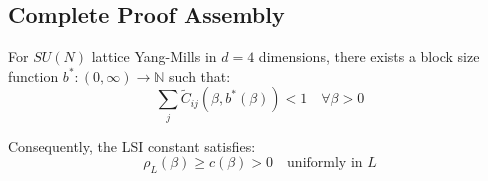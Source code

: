 \subsection{Complete Proof Assembly}

\begin{theorem}
\label{thm:block-dobrushin-all-beta}
For $SU(N)$ lattice Yang-Mills in $d = 4$ dimensions, there exists a block 
size function $b^*: (0, \infty) \to \mathbb{N}$ such that:
\[
\sum_j \tilde{C}_{ij}(\beta, b^*(\beta)) < 1 \quad \forall \beta > 0
\]

Consequently, the LSI constant satisfies:
\[
\rho_L(\beta) \geq c(\beta) > 0 \quad \text{uniformly in } L
\]
\end{theorem}


